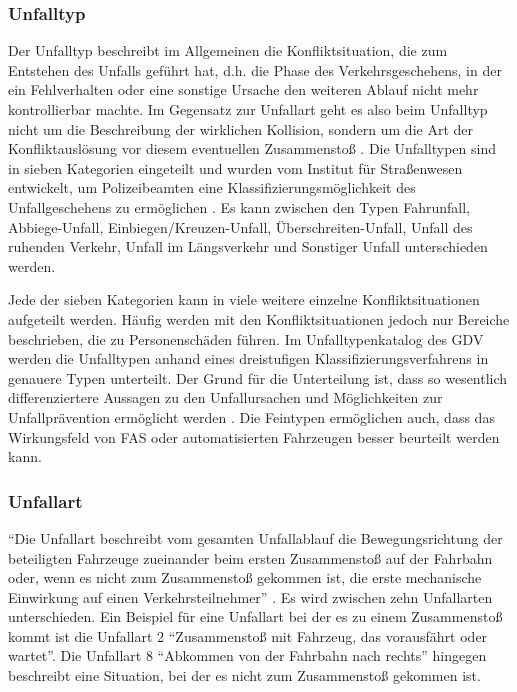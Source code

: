 \subsubsection{Unfalltyp}
Der Unfalltyp beschreibt im Allgemeinen die Konfliktsituation, die zum Entstehen des Unfalls geführt hat, d.h. die Phase des Verkehrsgeschehens, in der ein Fehlverhalten oder eine sonstige Ursache den weiteren Ablauf nicht mehr kontrollierbar machte. Im Gegensatz zur Unfallart geht es also beim Unfalltyp nicht um die Beschreibung der wirklichen Kollision, sondern um die Art der Konfliktauslösung vor diesem eventuellen Zusammenstoß \parencite[S. 16]{StatistischesBundesamt.2018b}. Die Unfalltypen sind in sieben Kategorien eingeteilt und wurden vom Institut für Straßenwesen entwickelt, um Polizeibeamten eine Klassifizierungsmöglichkeit des Unfallgeschehens zu ermöglichen \parencite[S. 16]{Gschwendtner.2015}. Es kann zwischen den Typen Fahrunfall, Abbiege-Unfall, Einbiegen/Kreuzen-Unfall, Überschreiten-Unfall, Unfall des ruhenden Verkehr, Unfall im Längsverkehr und Sonstiger Unfall unterschieden werden.

Jede der sieben Kategorien kann in viele weitere einzelne Konfliktsituationen aufgeteilt werden. Häufig werden mit den Konfliktsituationen jedoch nur Bereiche beschrieben, die zu Personenschäden führen. Im Unfalltypenkatalog des \ac{GDV} werden die Unfalltypen anhand eines dreistufigen Klassifizierungsverfahrens in genauere Typen unterteilt. Der Grund für die Unterteilung ist, dass so wesentlich differenziertere Aussagen zu den Unfallursachen und Möglichkeiten zur Unfallprävention ermöglicht werden \parencite[S. 106]{Grundl.2005}. Die Feintypen ermöglichen auch, dass das Wirkungsfeld von \ac{FAS} oder automatisierten Fahrzeugen besser beurteilt werden kann.

\subsubsection{Unfallart}
\enquote{Die Unfallart beschreibt vom gesamten Unfallablauf die Bewegungsrichtung der beteiligten Fahrzeuge zueinander beim ersten Zusammenstoß auf der Fahrbahn oder, wenn es nicht zum Zusammenstoß gekommen ist, die erste mechanische Einwirkung auf einen Verkehrsteilnehmer} \parencite[S. 17]{StatistischesBundesamt.2018b}. Es wird zwischen zehn Unfallarten unterschieden. Ein Beispiel für eine Unfallart bei der es zu einem Zusammenstoß kommt ist die Unfallart 2 \enquote{Zusammenstoß mit Fahrzeug, das vorausfährt oder wartet}. Die Unfallart 8 \enquote{Abkommen von der Fahrbahn nach rechts} hingegen beschreibt eine Situation, bei der es nicht zum Zusammenstoß gekommen ist.


